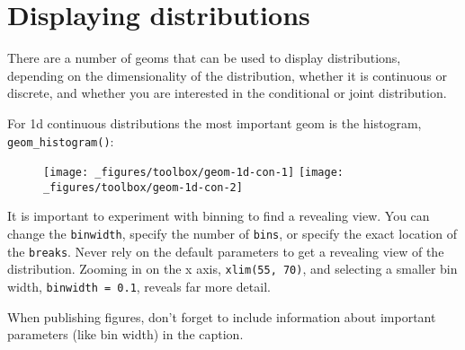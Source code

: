 \hypertarget{sec:distributions}{%
\section{Displaying distributions}\label{sec:distributions}}

There are a number of geoms that can be used to display distributions,
depending on the dimensionality of the distribution, whether it is
continuous or discrete, and whether you are interested in the
conditional or joint distribution. 

For 1d continuous distributions the most important geom is the
histogram, \texttt{geom\_histogram()}: 

\begin{Shaded}
\begin{Highlighting}[]
\OperatorTok{+}\StringTok{ }
\StringTok{  }\NormalTok{()}
\OperatorTok{+}\StringTok{ }
\StringTok{  }\NormalTok{(} \NormalTok{) }\OperatorTok{+}\StringTok{ }
\StringTok{  }\NormalTok{(}\NormalTok{, }\NormalTok{)}
\end{Highlighting}
\end{Shaded}

\begin{figure}[H]
  \texttt{[image: \_figures/toolbox/geom-1d-con-1]}%
  \texttt{[image: \_figures/toolbox/geom-1d-con-2]}
\end{figure}

It is important to experiment with binning to find a revealing view. You
can change the \texttt{binwidth}, specify the number of \texttt{bins},
or specify the exact location of the \texttt{breaks}. Never rely on the
default parameters to get a revealing view of the distribution. Zooming
in on the x axis, \texttt{xlim(55,\ 70)}, and selecting a smaller bin
width, \texttt{binwidth\ =\ 0.1}, reveals far more detail.

When publishing figures, don't forget to include information about
important parameters (like bin width) in the caption.

